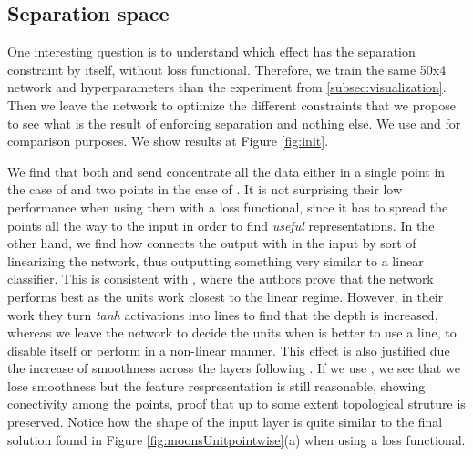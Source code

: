 \subsection{Separation space}

One interesting question is to understand which effect has the separation constraint by itself, without loss functional. Therefore, we train the same 50x4 network and hyperparameters than the experiment from \ref{subsec:visualization}. Then we leave the network to optimize the different constraints that we propose to see what is the result of enforcing separation and nothing else. We use \ReLU and \ReLUBN for comparison purposes. We show results at Figure \ref{fig:init}.

We find that both \ReLU and \ReLUBN send concentrate all the data  either in a single point in the case of \ReLU and two points in the case of \ReLUBN. It is not surprising their low performance when using them with a loss functional, since it has to spread the points all the way to the input in order to find \emph{useful} representations. In the other hand, we find how \SepLayer connects the output with in the input by sort of linearizing the network, thus outputting something very similar to a linear classifier. This is consistent with \cite{batchnormLinear}, where the authors prove that the network performs best as the units work closest to the linear regime. However, in their work they turn \emph{tanh} activations into lines to find that the depth is increased, whereas we leave the network to decide the units when is better to use a line, to disable itself or perform in a non-linear manner. This effect is also justified due the increase of smoothness across the layers following \cite{haurerandasok}. If we use \SepPointUnit, we see that we lose smoothness but the feature respresentation is still reasonable, showing conectivity among the points, proof that up to some extent topological struture is preserved. Notice how the shape of the input layer is quite similar to the final solution found in Figure \ref{fig:moonsUnitpointwise}(a) when using a loss functional.


